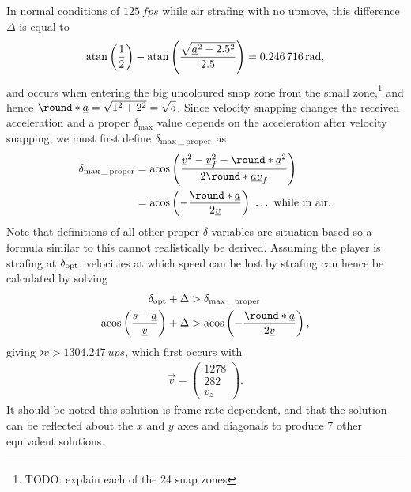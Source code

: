 In normal conditions of $\qty{125}{fps}$ while air strafing with no upmove, this difference $\Delta$ is equal to
\begin{align*}
\atan\left(\frac{1}{2} \right) - \atan\left(\frac{\sqrt{\flat{a}^2 - 2.5^2}}{2.5} \right) = \qty{0.246716}{rad},
\end{align*}
and occurs when entering the big uncoloured snap zone from the small zone,\footnote{TODO: explain each of the 24 snap zones} and hence $\round*{\flat{a}} = \sqrt{1^2 + 2^2} = \sqrt{5}$. Since velocity snapping changes the received acceleration and a proper $\delta_{\max}$ value depends on the acceleration after velocity snapping, we must first define $\delta_{\max\_\operatorname{proper}}$ as
\begin{align}
\delta_{\max\_\proper} &= \acos\left(\frac{\flat{v}^2 - \flat{v}_f^2 - \round*{\flat{a}}^2}{2\round*{\flat{a}}\flat{v}_f} \right)\\\nonumber
&= \acos\left(-\frac{\round*{\flat{a}}}{2\flat{v}} \right)\ \ldots\ \text{while in air.}
\end{align}
Note that definitions of all other proper $\delta$ variables are situation-based so a formula similar to this cannot realistically be derived.
Assuming the player is strafing at $\delta_{\operatorname{opt}}$, velocities at which speed can be lost by strafing can hence be calculated by solving
\begin{align*}
\delta_{\opt} + \Delta &> \delta_{\max\_\proper}\\
\acos\left(\frac{s - \flat{a}}{\flat{v}} \right) + \Delta &> \acos\left(-\frac{\round*{\flat{a}}}{2\flat{v}} \right),
\end{align*}
giving $\flat{v} > \qty{1304.247}{ups}$, which first occurs with
\begin{align*}
\vec{v} =
\begin{pmatrix}
1278 \\ 282 \\ v_z
\end{pmatrix}.
\end{align*}
It should be noted this solution is frame rate dependent, and that the solution can be reflected about the $x$ and $y$ axes and diagonals to produce 7 other equivalent solutions.
